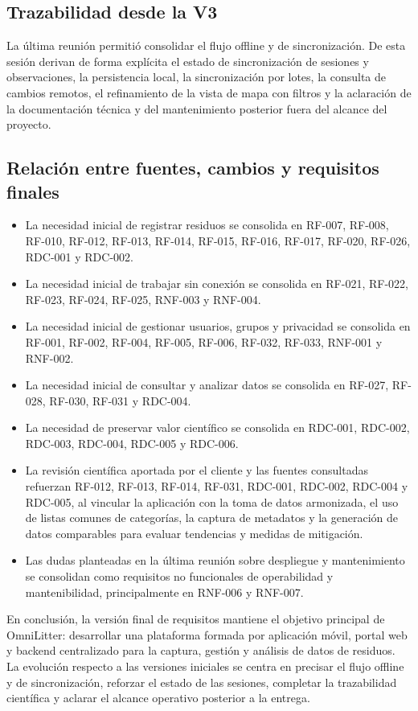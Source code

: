\subsection*{Trazabilidad desde la V3}

La última reunión permitió consolidar el flujo offline y de sincronización. De
esta sesión derivan de forma explícita el estado de sincronización de sesiones y
observaciones, la persistencia local, la sincronización por lotes, la consulta de
cambios remotos, el refinamiento de la vista de mapa con filtros y la aclaración
de la documentación técnica y del mantenimiento posterior fuera del alcance del
proyecto.

\subsection*{Relación entre fuentes, cambios y requisitos finales}

\begin{itemize}
\item La necesidad inicial de registrar residuos se consolida en RF-007, RF-008,
RF-010, RF-012, RF-013, RF-014, RF-015, RF-016, RF-017, RF-020, RF-026,
RDC-001 y RDC-002.

\item La necesidad inicial de trabajar sin conexión se consolida en RF-021,
RF-022, RF-023, RF-024, RF-025, RNF-003 y RNF-004.

\item La necesidad inicial de gestionar usuarios, grupos y privacidad se
consolida en RF-001, RF-002, RF-004, RF-005, RF-006, RF-032, RF-033, RNF-001
y RNF-002.

\item La necesidad inicial de consultar y analizar datos se consolida en RF-027,
RF-028, RF-030, RF-031 y RDC-004.

\item La necesidad de preservar valor científico se consolida en RDC-001,
RDC-002, RDC-003, RDC-004, RDC-005 y RDC-006.

\item La revisión científica aportada por el cliente y las fuentes consultadas
refuerzan RF-012, RF-013, RF-014, RF-031, RDC-001, RDC-002, RDC-004 y RDC-005,
al vincular la aplicación con la toma de datos armonizada, el uso de listas
comunes de categorías, la captura de metadatos y la generación de datos
comparables para evaluar tendencias y medidas de mitigación.

\item Las dudas planteadas en la última reunión sobre despliegue y mantenimiento
se consolidan como requisitos no funcionales de operabilidad y mantenibilidad,
principalmente en RNF-006 y RNF-007.
\end{itemize}

En conclusión, la versión final de requisitos mantiene el objetivo principal de
OmniLitter: desarrollar una plataforma formada por aplicación móvil, portal web y
backend centralizado para la captura, gestión y análisis de datos de residuos. La
evolución respecto a las versiones iniciales se centra en precisar el flujo
offline y de sincronización, reforzar el estado de las sesiones, completar la
trazabilidad científica y aclarar el alcance operativo posterior a la entrega.
